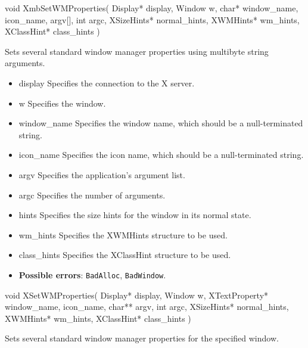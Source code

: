 \documentclass{report}
\begin{document}
\begin{itemize}
            \begin{cppcode}
            void XmbSetWMProperties(
                Display* display,
                Window w,
                char* window_name, icon_name, argv[],
                int argc,
                XSizeHints* normal_hints,
                XWMHints* wm_hints,
                XClassHint* class_hints
            )
            \end{cppcode}
            \bigbreak \noindent
            Sets several standard window manager properties using multibyte string arguments.

            \begin{itemize}
                \item display Specifies the connection to the X server.
                \item w Specifies the window.
                \item window\_name Specifies the window name, which should be a null-terminated string.
                \item icon\_name Specifies the icon name, which should be a null-terminated string.
                \item argv Specifies the application’s argument list.
                \item argc Specifies the number of arguments.
                \item hints Specifies the size hints for the window in its normal state.
                \item wm\_hints Specifies the XWMHints structure to be used.
                \item class\_hints Specifies the XClassHint structure to be used.
            \end{itemize}

            \begin{itemize}
                \item \textbf{Possible errors}: \texttt{BadAlloc}, \texttt{BadWindow}.
            \end{itemize}

            \begin{cppcode}
            void XSetWMProperties(
                Display* display,
                Window w,
                XTextProperty* window_name, icon_name,
                char** argv,
                int argc,
                XSizeHints* normal_hints,
                XWMHints* wm_hints,
                XClassHint* class_hints
            )
            \end{cppcode}
            \bigbreak \noindent
            Sets several standard window manager properties for the specified window.


\end{itemize}
\end{document}
